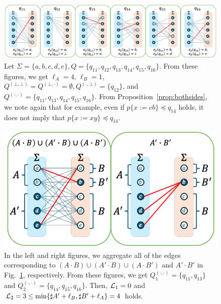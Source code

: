 \documentclass[a4paper]{article}
\begin{document}
\begin{figure}[t]
  \begin{center}
    \includegraphics[scale=0.54]{figs/lem11-prop4-eachreg1.pdf}
    \caption{Let $\Sigma=\{a,b,c,d,e\}, Q=\{q_{11},q_{12},q_{13},q_{14},q_{15},q_{16}\}$. From these figures, we get $\ell_A=4$, $\ell_B=1$, $Q^{(\bot,\bot)}=Q^{(\bot,\cdot)}=\emptyset, Q^{(\cdot,\bot)}=\{q_{12}\}$, and $Q^{(\cdot,\cdot)}=\{q_{11},q_{13},q_{14},q_{15},q_{16}\}$. From Proposition~\ref{prop:bothsides}, we note again that for example, even if $p \{ x:=cb \} \preceq q_{14}$ holds, it does not imply that $p \{ x:=xy \} \preceq q_{14}$.}\label{fig:lem11-prop4-eachreg1}
  \end{center}
\end{figure}

\begin{figure}[t]
  \begin{center}
    \includegraphics[scale=0.525]{figs/lem11-prop4-totalreg1.pdf}
      \caption{In the left and right figures, we aggregate all of the edges corresponding to $(A\cdot B)\cup (A'\cdot B)\cup (A\cdot B')$ and $A'\cdot B'$ in Fig.~\ref{fig:lem11-prop4-eachreg1}, respectively. From these figures, we get $Q_{1}^{(\cdot,\cdot)}=\{q_{11},q_{13}\}$ and $Q_{2}^{(\cdot,\cdot)}=\{q_{14},q_{15},q_{16}\}$. Then, ${\cal L}_{1}=0$ and ${\cal L}_{2} = 3 \leq \min\{\sharp A' + \ell_B, \sharp B' + \ell_A\} = 4$ holds.}\label{fig:lem11-prop4-totalreg1}
  \end{center}
\end{figure}
\end{document}
